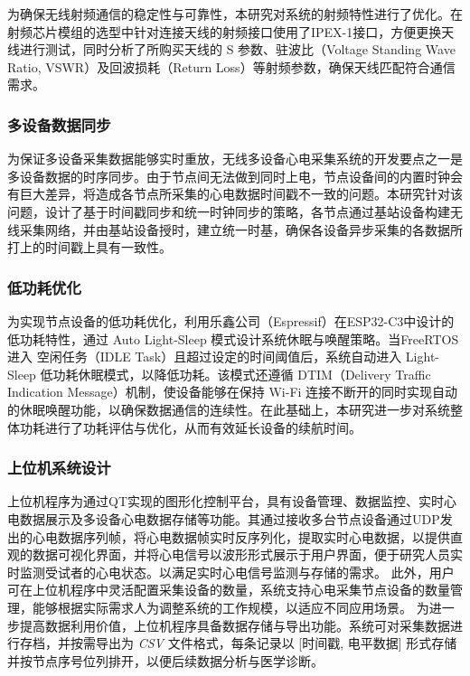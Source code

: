 为确保无线射频通信的稳定性与可靠性，本研究对系统的射频特性进行了优化。在射频芯片模组的选型中针对连接天线的射频接口使用了IPEX-1接口，方便更换天线进行测试，同时分析了所购买天线的 S 参数、驻波比（Voltage Standing Wave Ratio, VSWR）及回波损耗（Return Loss）等射频参数，确保天线匹配符合通信需求。

\subsubsection{多设备数据同步}  

为保证多设备采集数据能够实时重放，无线多设备心电采集系统的开发要点之一是多设备数据的时序同步。由于节点间无法做到同时上电，节点设备间的内置时钟会有巨大差异，将造成各节点所采集的心电数据时间戳不一致的问题。本研究针对该问题，设计了基于时间戳同步和统一时钟同步的策略，各节点通过基站设备构建无线采集网络，并由基站设备授时，建立统一时基，确保各设备异步采集的各数据所打上的时间戳上具有一致性。

\subsubsection{低功耗优化}  

为实现节点设备的低功耗优化，利用乐鑫公司（Espressif）在ESP32-C3中设计的低功耗特性，通过 Auto Light-Sleep 模式设计系统休眠与唤醒策略。当FreeRTOS进入 空闲任务（IDLE Task）且超过设定的时间阈值后，系统自动进入 Light-Sleep 低功耗休眠模式，以降低功耗。该模式还遵循 DTIM（Delivery Traffic Indication Message）机制，使设备能够在保持 Wi-Fi 连接不断开的同时实现自动的休眠唤醒功能，以确保数据通信的连续性。在此基础上，本研究进一步对系统整体功耗进行了功耗评估与优化，从而有效延长设备的续航时间。

\subsubsection{上位机系统设计}  

上位机程序为通过QT实现的图形化控制平台，具有设备管理、数据监控、实时心电数据展示及多设备心电数据存储等功能。其通过接收多台节点设备通过UDP发出的心电数据序列帧，将心电数据帧实时反序列化，提取实时心电数据，以提供直观的数据可视化界面，并将心电信号以波形形式展示于用户界面，便于研究人员实时监测受试者的心电状态。以满足实时心电信号监测与存储的需求。
此外，用户可在上位机程序中灵活配置采集设备的数量，系统支持心电采集节点设备的数量管理，能够根据实际需求人为调整系统的工作规模，以适应不同应用场景。
为进一步提高数据利用价值，上位机程序具备数据存储与导出功能。系统可对采集数据进行存档，并按需导出为 \textit{CSV} 文件格式，每条记录以 [时间戳, 电平数据] 形式存储并按节点序号位列排开，以便后续数据分析与医学诊断。

